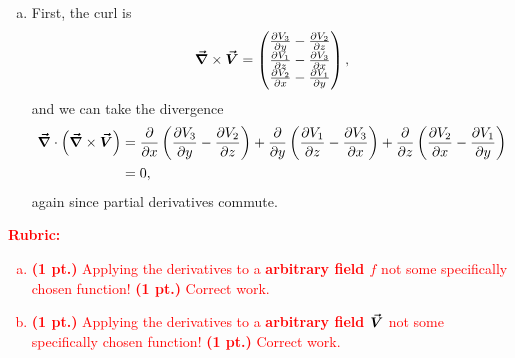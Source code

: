 \documentclass[12pt]{article} %
\begin{document}
\begin{solution}
\begin{enumerate}[(a)]
        \item First, the curl is
        \[
        \boldsymbol{\vec{\nabla}} \times \boldsymbol{\vec{V}} = \begin{pmatrix} \frac{\partial V_3}{\partial y} - \frac{\partial V_2}{\partial z} \\ \frac{\partial V_1}{\partial z} - \frac{\partial V_3}{\partial x} \\ \frac{\partial V_2}{\partial x} - \frac{\partial V_1}{\partial y} \end{pmatrix},
        \]
        and we can take the divergence
        \begin{align*}
            \boldsymbol{\vec{\nabla}} \cdot \left(\boldsymbol{\vec{\nabla}} \times \boldsymbol{\vec{V}}\right) &= \frac{\partial}{\partial x} \left(\frac{\partial V_3}{\partial y} - \frac{\partial V_2}{\partial z}\right) +  \frac{\partial}{\partial y} \left(\frac{\partial V_1}{\partial z} - \frac{\partial V_3}{\partial x}\right) +  \frac{\partial}{\partial z} \left(\frac{\partial V_2}{\partial x} - \frac{\partial V_1}{\partial y}\right)\\
            &= 0,
        \end{align*}
        again since partial derivatives commute.
    \end{enumerate}
\end{solution}
\vspace*{1cm}
\textcolor{red}{
\noindent \textbf{Rubric:}
\begin{enumerate}[(a)]
    \item \textbf{(1 pt.)} Applying the derivatives to a \textbf{arbitrary field $f$} not some specifically chosen function! \textbf{(1 pt.)} Correct work.
    \item \textbf{(1 pt.)} Applying the derivatives to a \textbf{arbitrary field $\boldsymbol{\vec{V}}$} not some specifically chosen function! \textbf{(1 pt.)} Correct work.
\end{enumerate}
}
\end{document}
